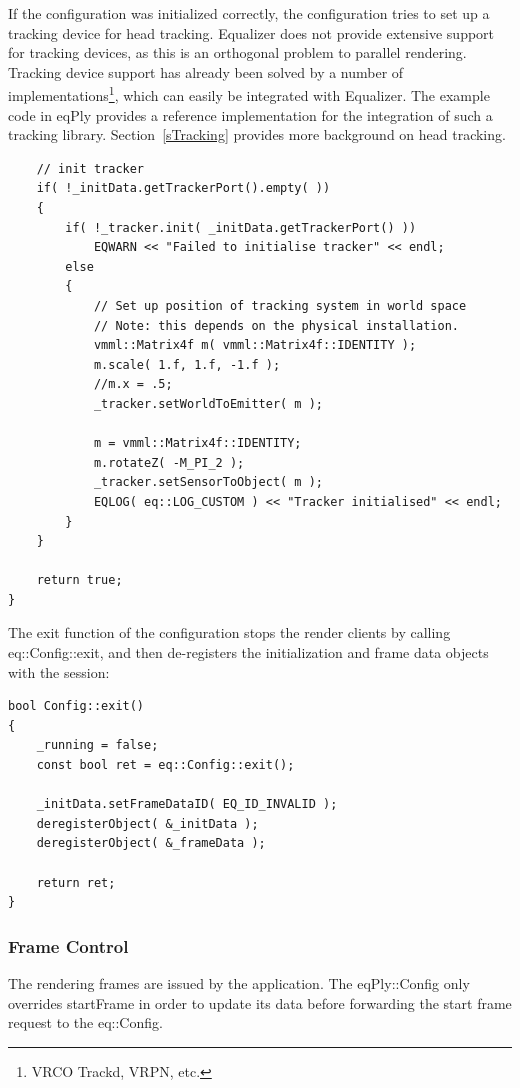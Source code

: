 \documentclass[10pt,a4]{scrartcl}
\newcommand{\sref}[1]{Section~\ref{#1}}
\begin{document}
If the configuration was initialized correctly, the configuration tries
to set up a tracking device for head tracking. Equalizer does not
provide extensive support for tracking devices, as this is an orthogonal
problem to parallel rendering. Tracking device support has already been
solved by a number of implementations\footnote{VRCO Trackd, VRPN, etc.},
which can easily be integrated with Equalizer. The example code in
\textsf{eqPly} provides a reference implementation for the integration
of such a tracking library. \sref{sTracking} provides more background on
head tracking.

{\footnotesize\begin{lstlisting}
    // init tracker
    if( !_initData.getTrackerPort().empty( ))
    {
        if( !_tracker.init( _initData.getTrackerPort() ))
            EQWARN << "Failed to initialise tracker" << endl;
        else
        {
            // Set up position of tracking system in world space
            // Note: this depends on the physical installation.
            vmml::Matrix4f m( vmml::Matrix4f::IDENTITY );
            m.scale( 1.f, 1.f, -1.f );
            //m.x = .5;
            _tracker.setWorldToEmitter( m );

            m = vmml::Matrix4f::IDENTITY;
            m.rotateZ( -M_PI_2 );
            _tracker.setSensorToObject( m );
            EQLOG( eq::LOG_CUSTOM ) << "Tracker initialised" << endl;
        }
    }

    return true;
}
\end{lstlisting}}%

The exit function of the configuration stops the render clients by calling
\textsf{eq::Con\-fig::exit}, and then de-registers the initialization and
frame data objects with the session:

{\footnotesize\begin{lstlisting}
bool Config::exit()
{
    _running = false;
    const bool ret = eq::Config::exit();

    _initData.setFrameDataID( EQ_ID_INVALID );
    deregisterObject( &_initData );
    deregisterObject( &_frameData );

    return ret;
}
\end{lstlisting}}

\subsubsection{Frame Control}

The rendering frames are issued by the application. The
\textsf{eqPly::Config} only overrides \textsf{startFrame} in order to
update its data before forwarding the start frame request to the
\textsf{eq::Config}.
\end{document}
